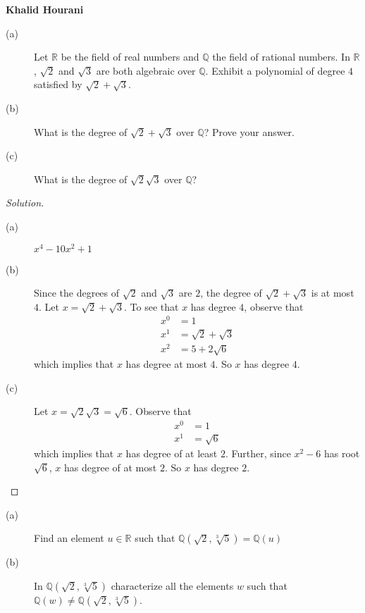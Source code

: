 \documentclass[12pt,leqno]{article}
\numberwithin{equation}{section}
\newcommand{\question}[2] {\vspace{.25in} \noindent\fbox{#1} #2 \vspace{.10in}}
\theoremstyle{definition}
\begin{document}
\thispagestyle{plain}
\begin{flushright}
\large{\textbf{Khalid Hourani\\
}}
\end{flushright}

\question{4}{ }
\begin{description}
 \item [(a)] Let $\mathbb{R}$ be the field of real numbers and $\mathbb{Q}$ the field of rational numbers. In $\mathbb{R}$, $\sqrt{2}$ and $\sqrt{3}$ are both algebraic over $\mathbb{Q}$. Exhibit a polynomial of degree $4$ satisfied by $\sqrt{2}+\sqrt{3}$.
 \item [(b)] What is the degree of $\sqrt{2}+\sqrt{3}$ over $\mathbb{Q}$? Prove your answer.
 \item [(c)] What is the degree of $\sqrt{2}\sqrt{3}$ over $\mathbb{Q}$?
\end{description}

\begin{proof}[Solution]
 \begin{description}
  \item [(a)] $x^4-10x^2+1$
  \item [(b)] Since the degrees of $\sqrt{2}$ and $\sqrt{3}$ are $2$, the degree of $\sqrt{2}+\sqrt{3}$ is at most $4$. Let $x=\sqrt{2}+\sqrt{3}$. To see that $x$ has degree $4$, observe that \begin{align*}x^0&=1\\x^1&
=\sqrt{2}+\sqrt{3}\\x^2&=5+2\sqrt{6}\end{align*} which implies that $x$ has degree at most $4$. So $x$ has degree $4$.
  \item [(c)] Let $x=\sqrt{2}\sqrt{3}=\sqrt{6}$. Observe that \begin{align*}x^0&=1\\x^1&=\sqrt{6}\end{align*} which implies that $x$ has degree of at least $2$. Further, since $x^2-6$ has root $\sqrt{6}$, $x$ has degree of at most $2$. So $x$ has degree $2$.
 \end{description}

\end{proof}

\question{6}{ }
\begin{description}
 \item [(a)] Find an element $u\in\mathbb{R}$ such that $\mathbb{Q}(\sqrt{2},\sqrt[3]{5})=\mathbb{Q}(u)$
 \item [(b)] In $\mathbb{Q}(\sqrt{2},\sqrt[3]{5})$ characterize all the elements $w$ such that $\mathbb{Q}(w)\not=\mathbb{Q}(\sqrt{2},\sqrt[3]{5})$.
\end{description}
\end{document}
